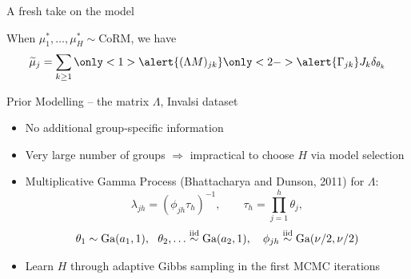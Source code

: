\documentclass[10.5pt, aspectratio=169]{beamer} %
\newcommand{\iid}{\stackrel{\mbox{\scriptsize iid}}{\sim}}
\newcommand{\mutilde}{\widetilde{\mu}}
\begin{document}
\begin{frame}{A fresh take on the model}

When $\mu^*_1, \ldots, \mu^*_H \sim \mbox{CoRM}$, we have
\[
	\mutilde_j = \sum_{k \geq 1} \only<1>{\alert{(\Lambda M)_{jk}}} \only<2->{\alert{\Gamma_{jk}}} J_k \delta_{\theta_k}
\]



\end{frame}


\begin{frame}{Prior Modelling -- the matrix $\Lambda$, Invalsi dataset}

\begin{itemize}[<+->]
	
	\item No additional group-specific information
	
	\item Very large number of groups $\Longrightarrow$ impractical to choose $H$ via model selection
	
	\item \alert{Multiplicative Gamma Process} (Bhattacharya and Dunson, 2011) for $\Lambda$:
	\[
		\lambda_{jh} = (\phi_{jh} \tau_h)^{-1}, \qquad \tau_{h} = \prod_{j=1}^h \theta_j,	
	\]
	\[
		\theta_1 \sim \mbox{Ga}(a_1, 1), \ \  \theta_2, \ldots \iid  \mbox{Ga}(a_2, 1), \quad  \phi_{jh} \iid  \mbox{Ga}(\nu/2, \nu/2)
	\] 
	
	\item Learn $H$ through adaptive Gibbs sampling in the first MCMC iterations
\end{itemize}
\end{frame}
\end{document}
